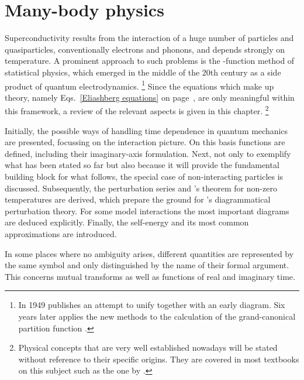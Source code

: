 
\chapter{Many-body physics}
\label{many-body physics}

Superconductivity results from the interaction of a huge number of particles and
quasiparticles, conventionally electrons and phonons, and depends strongly on
temperature. A prominent approach to such problems is the -function
method of statistical physics, which emerged in the middle of the 20th century
as a side product of quantum electrodynamics.%
%
\footnote{In 1949  publishes an attempt to unify  \cite{Dyson49a} together with an
early  diagram. Six years later  applies the new
methods to the calculation of the grand-canonical partition function
\cite{Matsubara55}.}
%
Since the equations which make up  theory, namely
Eqs.~\ref{Eliashberg equations} on page~\pageref{Eliashberg equations}, are only
meaningful within this framework, a review of the relevant aspects is given in
this chapter.%
%
\footnote{Physical concepts that are very well established nowadays will be
stated without reference to their specific origins. They are covered in most
textbooks on this subject such as the one by  \cite{Mahan00}.}

Initially, the possible ways of handling time dependence in quantum mechanics
are presented, focussing on the interaction picture. On this basis 
functions are defined, including their imaginary-axis formulation. Next, not
only to exemplify what has been stated so far but also because it will provide
the fundamental building block for what follows, the special case of
non-interacting particles is discussed. Subsequently, the perturbation series
and 's theorem for non-zero temperatures are derived, which prepare
the ground for 's diagrammatical perturbation theory. For some
model interactions the most important diagrams are deduced explicitly. Finally,
the self-energy and its most common approximations are introduced.

In some places where no ambiguity arises, different quantities are represented
by the same symbol and only distinguished by the name of their formal argument.
This concerns mutual  transforms as well as functions of real and
imaginary time.

